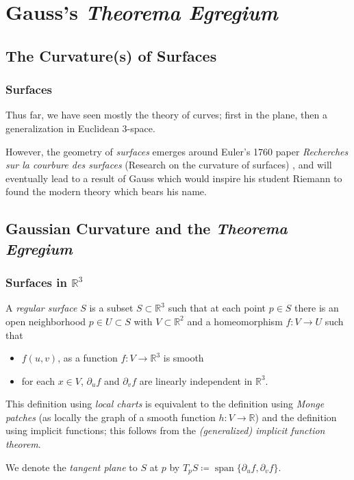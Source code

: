\documentclass{beamer}
\DeclareMathOperator{\Span}{span}
\newcommand{\R}{\mathbb{R}}
\theoremstyle{definition}
\begin{document}
\section{Gauss's \emph{Theorema Egregium}}

\subsection{The Curvature(s) of Surfaces}

\begin{frame}
    \frametitle{Surfaces}

    Thus far, we have seen mostly the theory of curves; first in the plane,
    then a generalization in Euclidean 3-space.

    However, the geometry of \emph{surfaces} emerges around Euler's 1760
    paper \textit{Recherches sur la courbure des surfaces} (Research on
    the curvature of surfaces) \cite{geom-diff-view,euler}, and will eventually
    lead to a result of Gauss which would inspire his student Riemann to
    found the modern theory which bears his name.

\end{frame}

\subsection{Gaussian Curvature and the \emph{Theorema Egregium}}

\begin{frame}
    \frametitle{Surfaces in $\R^3$}

    \begin{definition}
        A \emph{regular surface} $S$ is a subset $S \subset \R^3$ such that at each point
        $p \in S$ there is an open neighborhood $p \in U \subset S$ with $V \subset \R^2$
        and a homeomorphism $f : V \to U$ such that
        \begin{itemize}
            \item $f(u,v)$, as a function $f : V \to \R^3$ is smooth
            \item for each $x \in V$, $\partial_u f$ and $\partial_v f$ are
            linearly independent in $\R^3$.
        \end{itemize}
    \end{definition}

    This definition using \emph{local charts} is equivalent
    to the definition using \emph{Monge patches} (as locally the graph
    of a smooth function $h : V \to \R$) and the definition using implicit functions;
    this follows from the \emph{(generalized) implicit function theorem}.

    We denote the \emph{tangent plane} to $S$ at $p$ by
    \(
        T_pS \coloneqq \Span\{\partial_uf,\partial_vf\}.
    \)
\end{frame}
\end{document}
